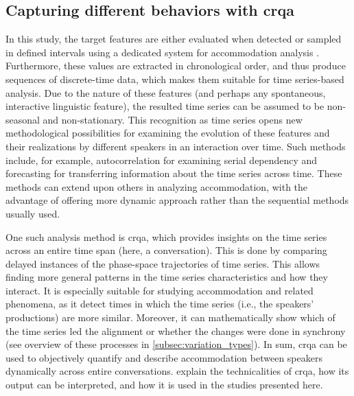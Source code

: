 
\subsection{Capturing different behaviors with \acs{crqa}}
\label{subsec:capturing_behaviors}

In this study, the target features are either evaluated when detected or sampled in defined intervals using a dedicated system for accommodation analysis \citep{Raveh2018Specom}.
Furthermore, these values are extracted in chronological order, and thus produce sequences of discrete-time data, which makes them suitable for time series-based analysis.
Due to the nature of these features (and perhaps any spontaneous, interactive linguistic feature), the resulted time series can be assumed to be non-seasonal and non-stationary.
This recognition as time series opens new methodological possibilities for examining the evolution of these features and their realizations by different speakers in an interaction over time.
Such methods include, for example, autocorrelation for examining serial dependency and forecasting for transferring information about the time series across time.
These methods can extend upon others in analyzing accommodation, with the advantage of offering more dynamic approach rather than the sequential methods usually used.

One such analysis method is \acf{crqa}, which provides insights on the time series across an entire time span (here, a conversation).
This is done by comparing delayed instances of the phase-space trajectories of time series.
This allows finding more general patterns in the time series characteristics and how they interact.
It is especially suitable for studying accommodation and related phenomena, as it detect times in which the time series (i.e., the speakers' productions) are more similar.
Moreover, it can mathematically show which of the time series led the alignment or whether the changes were done in synchrony (see overview of these processes in \cref{subsec:variation_types}).
In sum, \ac{crqa} can be used to objectively quantify and describe accommodation between speakers dynamically across entire conversations.
 explain the technicalities of \ac{crqa}, how its output can be interpreted, and how it is used in the studies presented here.

